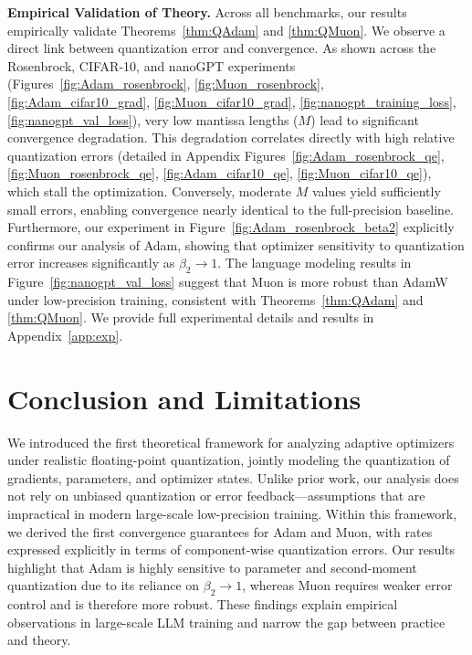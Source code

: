 \documentclass[11pt, letterpaper]{article}
\begin{document}
\textbf{Empirical Validation of Theory.}
Across all benchmarks, our results empirically validate Theorems~\ref{thm:QAdam} and \ref{thm:QMuon}. We observe a direct link between quantization error and convergence. As shown across the Rosenbrock, CIFAR-10, and nanoGPT experiments (Figures~\ref{fig:Adam_rosenbrock}, \ref{fig:Muon_rosenbrock}, \ref{fig:Adam_cifar10_grad}, \ref{fig:Muon_cifar10_grad}, \ref{fig:nanogpt_training_loss}, \ref{fig:nanogpt_val_loss}), very low mantissa lengths ($M$) lead to significant convergence degradation. This degradation correlates directly with high relative quantization errors (detailed in Appendix Figures~\ref{fig:Adam_rosenbrock_qe}, \ref{fig:Muon_rosenbrock_qe}, \ref{fig:Adam_cifar10_qe}, \ref{fig:Muon_cifar10_qe}), which stall the optimization. Conversely, moderate $M$ values yield sufficiently small errors, enabling convergence nearly identical to the full-precision baseline. Furthermore, our experiment in Figure~\ref{fig:Adam_rosenbrock_beta2} explicitly confirms our analysis of Adam, showing that optimizer sensitivity to quantization error increases significantly as $\beta_2 \to 1$. The language modeling results in Figure~\ref{fig:nanogpt_val_loss} suggest that Muon is more robust than AdamW under low-precision training, consistent with Theorems~\ref{thm:QAdam} and \ref{thm:QMuon}. We provide full experimental details and results in Appendix~\ref{app:exp}.




\section{Conclusion and Limitations}\label{sec:conclusion}
We introduced the first theoretical framework for analyzing adaptive optimizers under realistic floating-point quantization, jointly modeling the quantization of gradients, parameters, and optimizer states. Unlike prior work, our analysis does not rely on unbiased quantization or error feedback—assumptions that are impractical in modern large-scale low-precision training. Within this framework, we derived the first convergence guarantees for Adam and Muon, with rates expressed explicitly in terms of component-wise quantization errors. Our results highlight that Adam is highly sensitive to parameter and second-moment quantization due to its reliance on $\beta_2 \to 1$, whereas Muon requires weaker error control and is therefore more robust. These findings explain empirical observations in large-scale LLM training and narrow the gap between practice and theory.
\end{document}
